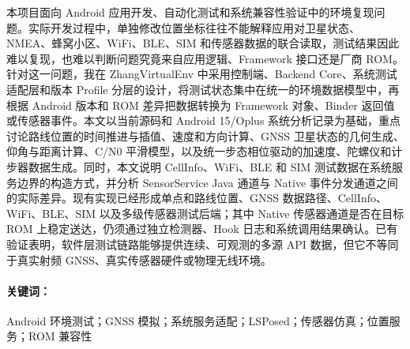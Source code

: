 \setlength{\parindent}{2em}
\setlength{\parskip}{0.25em}
\justifying
本项目面向 Android 应用开发、自动化测试和系统兼容性验证中的环境复现问题。实际开发过程中，单独修改位置坐标往往不能解释应用对卫星状态、NMEA、蜂窝小区、WiFi、BLE、SIM 和传感器数据的联合读取，测试结果因此难以复现，也难以判断问题究竟来自应用逻辑、Framework 接口还是厂商 ROM。针对这一问题，我在 ZhangVirtualEnv 中采用控制端、Backend Core、系统测试适配层和版本 Profile 分层的设计，将测试状态集中在统一的环境数据模型中，再根据 Android 版本和 ROM 差异把数据转换为 Framework 对象、Binder 返回值或传感器事件。本文以当前源码和 Android 15/Oplus 系统分析记录为基础，重点讨论路线位置的时间推进与插值、速度和方向计算、GNSS 卫星状态的几何生成、仰角与距离计算、C/N0 平滑模型，以及统一步态相位驱动的加速度、陀螺仪和计步器数据生成。同时，本文说明 CellInfo、WiFi、BLE 和 SIM 测试数据在系统服务边界的构造方式，并分析 SensorService Java 通道与 Native 事件分发通道之间的实际差异。现有实现已经形成单点和路线位置、GNSS 数据路径、CellInfo、WiFi、BLE、SIM 以及多级传感器测试后端；其中 Native 传感器通道是否在目标 ROM 上稳定送达，仍须通过独立检测器、Hook 日志和系统调用结果确认。已有验证表明，软件层测试链路能够提供连续、可观测的多源 API 数据，但它不等同于真实射频 GNSS、真实传感器硬件或物理无线环境。
\paragraph{关键词：} Android 环境测试；GNSS 模拟；系统服务适配；LSPosed；传感器仿真；位置服务；ROM 兼容性